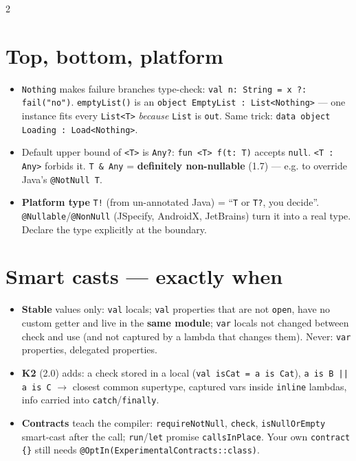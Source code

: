 \documentclass[8pt]{extarticle}
\newcommand\elv{\texttt{\hbox{?}\hbox{:}}}
\newcommand\cc{\texttt{\hbox{:}\hbox{:}}}
\begin{document}
\begin{multicols}{2}
\raggedright

\section{Top, bottom, platform}
\begin{itemize}\raggedright
  \item \texttt{Nothing} makes failure branches type-check: \texttt{val n: String = x \elv{}
        fail("no")}. \texttt{emptyList()} is an \texttt{object EmptyList : List<Nothing>} —
        one instance fits every \texttt{List<T>} \emph{because} \texttt{List} is \texttt{out}.
        Same trick: \texttt{data object Loading : Load<Nothing>}.
  \item Default upper bound of \texttt{<T>} is \texttt{Any?}: \texttt{fun <T> f(t: T)} accepts
        \texttt{null}. \texttt{<T : Any>} forbids it. \texttt{T \& Any} = \textbf{definitely
        non-nullable} (1.7) — e.g. to override Java's \texttt{@NotNull T}.
  \item \textbf{Platform type} \texttt{T!} (from un-annotated Java) = ``\texttt{T} or
        \texttt{T?}, you decide''. \texttt{@Nullable}/\texttt{@NonNull} (JSpecify, AndroidX,
        JetBrains) turn it into a real type. Declare the type explicitly at the boundary.
\end{itemize}

\section{Smart casts — exactly when}
\begin{itemize}\raggedright
  \item \textbf{Stable} values only: \texttt{val} locals; \texttt{val} properties that are
        not \texttt{open}, have no custom getter and live in the \textbf{same module};
        \texttt{var} locals not changed between check and use (and not captured by a lambda
        that changes them). Never: \texttt{var} properties, delegated properties.
  \item \textbf{K2} (2.0) adds: a check stored in a local (\texttt{val isCat = a is Cat}),
        \texttt{a is B \hbox{|}\hbox{|} a is C} $\to$ closest common supertype, captured vars inside
        \texttt{inline} lambdas, info carried into \texttt{catch}/\texttt{finally}.
  \item \textbf{Contracts} teach the compiler: \texttt{requireNotNull}, \texttt{check},
        \texttt{isNullOrEmpty} smart-cast after the call; \texttt{run}/\texttt{let} promise
        \texttt{callsInPlace}. Your own \texttt{contract \{\}} still needs
        \texttt{@OptIn(ExperimentalContracts}\cc\texttt{class)}.
\end{itemize}


\end{multicols}
\end{document}

